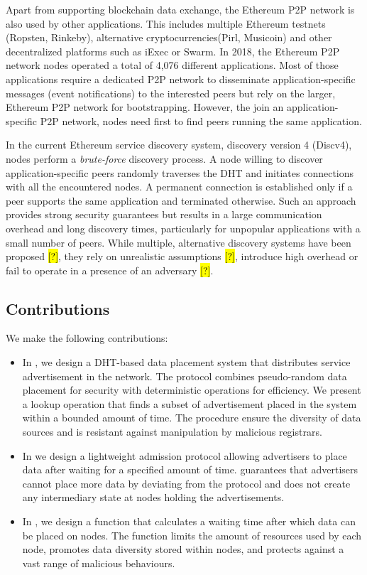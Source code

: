 Apart from supporting blockchain data exchange, the Ethereum P2P network is also used by other applications. This includes multiple Ethereum testnets (Ropsten, Rinkeby),  alternative cryptocurrencies(Pirl, Musicoin) and other decentralized platforms such as iExec or Swarm.
In 2018, the Ethereum P2P network nodes operated a total of 4,076 different applications\cite{kim2018measuring}. Most of those applications require a dedicated P2P network to disseminate application-specific messages (\eg event notifications) to the interested peers but rely on the larger, Ethereum P2P network for bootstrapping. However, the join an application-specific P2P network, nodes need first to find peers running the same application. 

In the current Ethereum service discovery system, \ie discovery version 4 (Discv4), nodes perform a \textit{brute-force} discovery process. A node willing to discover application-specific peers randomly traverses the DHT and initiates connections with all the encountered nodes. A permanent connection is established only if a peer supports the same application and terminated otherwise. Such an approach provides strong security guarantees but results in a large communication overhead and long discovery times, particularly for unpopular applications with a small number of peers. While multiple, alternative discovery systems have been proposed \hl{[?]}, they rely on unrealistic assumptions \hl{[?]}, introduce high overhead or fail to operate in a presence of an adversary \hl{[?]}. 


\subsection{Contributions} 
We make the following contributions:
\begin{itemize}
    \item In , we design a DHT-based data placement system that distributes service advertisement in the network. The protocol combines pseudo-random data placement for security with deterministic operations for efficiency. We present a lookup operation that finds a subset of advertisement placed in the system within a bounded amount of time. The procedure ensure the diversity of data sources and is resistant against manipulation by malicious registrars. 
    \item In  we design a lightweight admission protocol allowing advertisers to place data after waiting for a specified amount of time. \sysname guarantees that advertisers cannot place more data by deviating from the protocol and does not create any intermediary state at nodes holding the advertisements. 
    \item In , we design a function that calculates a waiting time after which data can be placed on nodes. The function limits the amount of resources used by each node, promotes data diversity stored within nodes, and protects against a vast range of malicious behaviours. 
\end{itemize}

